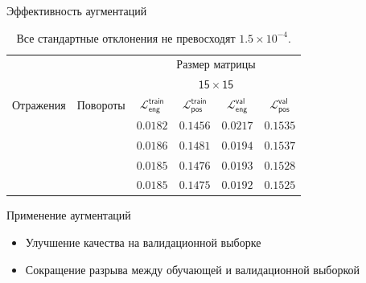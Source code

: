 \documentclass[9pt]{beamer}
\newcommand{\cmark}{\ding{51}}
\newcommand{\xmark}{\ding{55}}
\begin{document}
\begin{frame}{Эффективность аугментаций}
    \begin{table}
        \footnotesize
        \centering
        \begin{tabular}{cc|cccc}
            \toprule
            {} & {} & \multicolumn{4}{c}{\textsf{Размер матрицы}} \\
            \cmidrule(lr){3-6}
            {} & {} & \multicolumn{4}{c}{$\mathsf{15 \times 15}$} \\
            \midrule
            \textsf{Отражения} & \textsf{Повороты} & $\mathcal{L}_{\mathsf{eng}}^{\mathsf{train}}$ & $\mathcal{L}_{\mathsf{pos}}^{\mathsf{train}}$ & $\mathcal{L}_{\mathsf{eng}}^{\mathsf{val}}$ & $\mathcal{L}_{\mathsf{pos}}^{\mathsf{val}}$ \\
            \midrule
            \xmark & \xmark & $\mathbf{0.0182}$ & $\mathbf{0.1456}$ & $\mathsf{0.0217}$ & $\mathsf{0.1535}$ \\
            \cmark & \xmark & $\mathsf{0.0186}$ & $\mathsf{0.1481}$ & $\mathsf{0.0194}$ & $\mathsf{0.1537}$ \\
            \xmark & \cmark & $\mathsf{0.0185}$ & $\mathsf{0.1476}$ & $\mathsf{0.0193}$ & $\mathsf{0.1528}$ \\
            \cmark & \cmark & $\mathsf{0.0185}$ & $\mathsf{0.1475}$ & $\mathbf{0.0192}$ & $\mathbf{0.1525}$ \\        
            
            \bottomrule
        \end{tabular}
        \caption{Все стандартные отклонения не превосходят $1.5 \times 10^{-4}$.}
    \end{table}

    \begin{block}{Применение аугментаций}
        \begin{itemize}
            \item Улучшение качества на валидационной выборке
            \item Сокращение разрыва между обучающей и валидационной выборкой
        \end{itemize}
    \end{block}
\end{frame}
\end{document}
